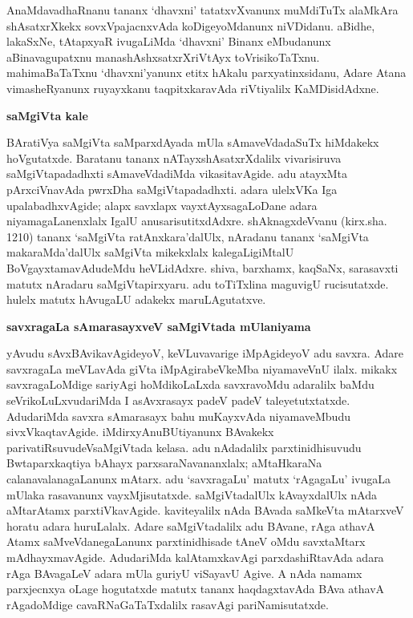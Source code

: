 AnaMdavadhaRnanu tananx `dhavxni' tatatxvXvanunx muMdiTuTx alaMkAra shAsatxrXkekx sovxVpajacnx\-vAda koDigeyoMdanunx niVDidanu. aBidhe, lakaSxNe, tAtapxyaR ivugaLiMda `dhavxni' Binanx eMbudanunx aBinavagupatxnu manashAshxsatxrXriVtAyx toVrisikoTaTxnu. mahimaBaTaTxnu `dhavxni'yanunx etitx hAkalu parxyatinxsidanu, Adare Atana vimasheRyanunx ruyayxkanu taqpitxkaravAda riVtiyalilx KaMDisidAdxne.

\bigskip
\begin{center}
{\Large\bf saMgiVta kale}
\end{center}

BAratiVya saMgiVta saMparxdAyada mUla sAmaveVdadaSuTx hiMdakekx hoVgutatxde. Baratanu tananx nATayxshAsatxrXdalilx vivarisiruva saMgiVtapadadhxti sAmaveVdadiMda vikasita\break\-vAgide. adu atayxMta pArxciVnavAda pwrxDha saMgiVtapadadhxti. adara ulelxVKa Iga upa\-labadhxvAgide; alapx savxlapx vayxtAyxsagaLoDane adara niyamagaLanenxlalx IgalU anusarisu\-titxdAdxre. shAknagxdeVvanu (kirx.sha. 1210) tananx `saMgiVta ratAnxkara'dalUlx, nAradanu tananx `saMgiVta makaraMda'dalUlx saMgiVta mikekxlalx kalegaLigiMtalU BoVgayxtamavAdudeMdu heVLidAdxre. shiva, barxhamx, kaqSaNx, sarasavxti matutx nAradaru saMgiVtapirxyaru. adu toTiTxlina maguvigU rucisutatxde. hulelx matutx hAvugaLU adakekx maruLAgutatxve.

\bigskip
\begin{center}
{\Large\bf savxragaLa sAmarasayxveV saMgiVtada mUlaniyama}
\end{center}

yAvudu sAvxBAvikavAgideyoV, keVLuvavarige iMpAgideyoV adu savxra. Adare savxragaLa meVLavAda giVta iMpAgirabeVkeMba niyamaveVnU ilalx. mikakx savxragaLoMdige sariyAgi hoMdikoLaLxda savxravoMdu adaralilx baMdu seVrikoLuLxvudariMda I asAvx\-rasayx padeV padeV taleyetutxtatxde. AdudariMda savxra sAmarasayx bahu muKayxvAda niyama\break\-veMbudu sivxVkaqtavAgide. iMdirxyAnuBUtiyanunx BAvakekx parivatiRsuvudeV\break saMgiVtada kelasa. adu nAdadalilx parxtinidhisuvudu Bwtaparxkaqtiya bAhayx parxsaraNavananxlalx; aMtaHkaraNa calanavalanagaLanunx mAtarx. adu `savxragaLu' matutx `rAgagaLu' ivugaLa mUlaka rasavanunx vayxMjisutatxde. saMgiVtadalUlx kAvayxdalUlx nAda aMtarAtamx parxtiVka\-vAgide. kaviteyalilx nAda BAvada saMkeVta mAtarxveV horatu adara huruLalalx. Adare saMgiVtadalilx adu BAvane, rAga athavA Atamx saMveVdanegaLanunx parxtinidhisade tAneV oMdu savxtaMtarx mAdhayxmavAgide. AdudariMda kalAtamxkavAgi parxdashiRtavAda adara rAga BAvagaLeV adara mUla guriyU viSayavU Agive. A nAda namamx parxjecnxya oLage hogutatxde matutx tananx haqdagxtavAda BAva athavA rAgadoMdige cavaRNaGaTaTxdalilx rasavAgi pariNamisutatxde.

